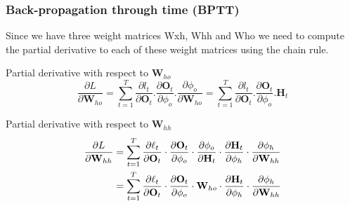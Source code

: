 \documentclass[
	11pt,
]{beamer}
\begin{document}

\begin{frame}
	\frametitle{Back-propagation through time (BPTT)}

		Since we have three weight matrices Wxh, Whh and Who we need to
compute the partial derivative to each of these weight matrices using the
chain rule.
		\smallskip
        \begin{block}{Partial derivative with respect to $\mathbf{W}_{ho}$}
        \begin{equation*}
            \frac{\partial L}{\partial \mathbf{W}_{ho}} = \sum_{t=1}^{T}\frac{\partial l_t}{\partial \mathbf{O}_t}.\frac{\partial \mathbf{O}_t}{\partial \phi_o}.\frac{\partial \phi_o}{\partial \mathbf{W}_{ho}} = \sum_{t=1}^{T}\frac{\partial l_t}{\partial \mathbf{O}_t}.\frac{\partial \mathbf{O}_t}{\partial \phi_o}.\mathbf{H}_t
        \end{equation*}
		\end{block}
	\begin{block}{Partial derivative with respect to $\mathbf{W}_{hh}$}
        \begin{equation*}
			\begin{split}
            \pdv{L}{\mathbf{W}_{hh}} &= \sum_{t=1}^T \pdv{\ell_t}{\mathbf{O}_t} \cdot \pdv{\mathbf{O}_t}{\phi_o} \cdot \pdv{\phi_o}{\mathbf{H}_t} \cdot \pdv{\mathbf{H}_t}{\phi_h} \cdot \pdv{\phi_h}{\mathbf{W}_{hh}} \\
									 &= \sum_{t=1}^T \pdv{\ell_t}{\mathbf{O}_t} \cdot \pdv{\mathbf{O}_t}{\phi_o} \cdot \mathbf{W}_{ho} \cdot \pdv{\mathbf{H}_t}{\phi_h} \cdot \pdv{\phi_h}{\mathbf{W}_{hh}} 
			\end{split}
        \end{equation*}
	\end{block}

\end{frame}
\end{document}
